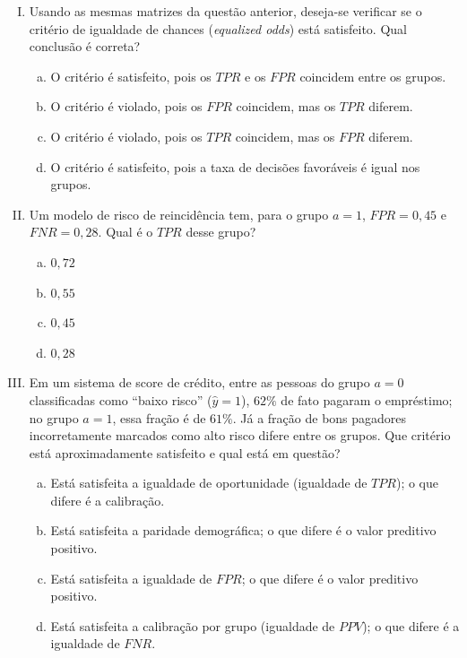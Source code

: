 \documentclass{dlproblemset}
\begin{document}
\begin{enumerate}[I)]
    \item Usando as mesmas matrizes da questão anterior, deseja-se verificar se o critério de igualdade de chances (\textit{equalized odds}) está satisfeito. Qual conclusão é correta?
    \begin{enumerate}[(a)]
        \item O critério é satisfeito, pois os $TPR$ e os $FPR$ coincidem entre os grupos.
        \item O critério é violado, pois os $FPR$ coincidem, mas os $TPR$ diferem.
        \item O critério é violado, pois os $TPR$ coincidem, mas os $FPR$ diferem.
        \item O critério é satisfeito, pois a taxa de decisões favoráveis é igual nos grupos.
    \end{enumerate}

    \item Um modelo de risco de reincidência tem, para o grupo $a{=}1$, $FPR = 0{,}45$ e $FNR = 0{,}28$. Qual é o $TPR$ desse grupo?
    \begin{enumerate}[(a)]
        \item $0{,}72$
        \item $0{,}55$
        \item $0{,}45$
        \item $0{,}28$
    \end{enumerate}

    \item Em um sistema de score de crédito, entre as pessoas do grupo $a{=}0$ classificadas como ``baixo risco'' ($\hat{y}{=}1$), $62\%$ de fato pagaram o empréstimo; no grupo $a{=}1$, essa fração é de $61\%$. Já a fração de bons pagadores incorretamente marcados como alto risco difere entre os grupos. Que critério está aproximadamente satisfeito e qual está em questão?
    \begin{enumerate}[(a)]
        \item Está satisfeita a igualdade de oportunidade (igualdade de $TPR$); o que difere é a calibração.
        \item Está satisfeita a paridade demográfica; o que difere é o valor preditivo positivo.
        \item Está satisfeita a igualdade de $FPR$; o que difere é o valor preditivo positivo.
        \item Está satisfeita a calibração por grupo (igualdade de $PPV$); o que difere é a igualdade de $FNR$.
    \end{enumerate}


\end{enumerate}
\end{document}
